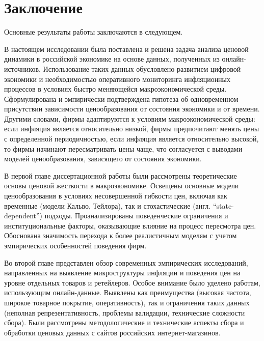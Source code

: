 \chapter*{Заключение}                       %


Основные результаты работы заключаются в следующем.

В настоящем исследовании была поставлена и решена задача анализа ценовой динамики в российской экономике на основе данных, полученных из онлайн-источников. Использование таких данных обусловлено развитием цифровой экономики и необходимостью оперативного мониторинга инфляционных процессов в условиях быстро меняющейся макроэкономической среды. Сформулирована и эмпирически подтверждена гипотеза об одновременном присутствии зависимости ценообразования от состояния экономики и от времени. Другими словами, фирмы адаптируются к условиям макроэкономической среды: если инфляция является относительно низкой, фирмы предпочитают менять цены с определенной периодичностью, если инфляция является относительно высокой, то фирмы начинают пересматривать цены чаще, что согласуется с выводами моделей ценообразования, зависящего от состояния экономики.

В первой главе диссертационной работы были рассмотрены теоретические основы ценовой жесткости в макроэкономике. Освещены основные модели ценообразования в условиях несовершенной гибкости цен, включая как временные (модели Кальво, Тейлора), так и стохастические (англ. ``state-dependent'') подходы. Проанализированы поведенческие ограничения и институциональные факторы, оказывающие влияние на процесс пересмотра цен. Обоснована значимость перехода к более реалистичным моделям с учетом эмпирических особенностей поведения фирм.

Во второй главе представлен обзор современных эмпирических исследований, направленных на выявление микроструктуры инфляции и поведения цен на уровне отдельных товаров и ретейлеров. Особое внимание было уделено работам, использующим онлайн-данные. Выявлены как преимущества (высокая частота, широкое товарное покрытие, оперативность), так и ограничения таких данных (неполная репрезентативность, проблемы валидации, технические сложности сбора). Были рассмотрены методологические и технические аспекты сбора и обработки ценовых данных с сайтов российских интернет-магазинов.

